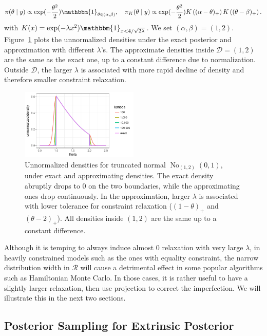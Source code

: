 \documentclass[10pt]{article}
\newcommand{\mc}[1]{\mathcal{#1}}
\DeclareMathOperator{\No}{No}
\DeclareMathOperator{\1}{\mathbbm{1}}
\begin{document}
$$\pi(\theta\mid y)\propto \exp(-\frac{\theta^2}{2}) \mathbbm{1}_{\theta\in(\alpha,\beta)}, \quad \pi_K(\theta\mid y)\propto \exp(-\frac{\theta^2}{2}) K \left ( (\alpha - \theta)_+ \right) K \left ( ( \theta - \beta)_+ \right).$$
with $K(x)= \exp( - \lambda x^2)\mathbbm{1}_{x<4/\sqrt{2\lambda}}$. We set $(\alpha, \beta)=(1,2)$. Figure~\ref{truncated_normal} plots the unnormalized densities under the exact posterior and approximation with different $\lambda$'s. The approximate densities inside $\mc D = (1,2)$ are the same as the exact one, up to a constant difference due to normalization. Outside $\mc D$, the larger $\lambda$ is associated with more rapid decline of density and therefore smaller constraint relaxation.

\begin{figure}[H]
 \centering
 \includegraphics[width=0.5\textwidth]{density_truncated_normal}
\caption{Unnormalized densities for truncated normal $\No_{(1,2)}(0,1)$, under exact and approximating densities. The exact density abruptly drops to $0$ on the two boundaries, while the approximating ones drop continuously. In the approximation, larger $\lambda$ is associated with lower tolerance for constraint relaxation ($( 1-\theta )_+$ and $( \theta - 2)_+$). All densities inside $(1,2)$ are the same up to a constant difference.}
\label{truncated_normal}
\end{figure}

Although it is temping to always induce almost $0$ relaxation with very large $\lambda$, in heavily constrained models such as the ones with equality constraint, the narrow distribution width in $\mc R$ will cause a detrimental effect in some popular algorithms such as Hamiltonian Monte Carlo. In those cases, it is rather useful to have a slightly larger relaxation, then use projection to correct the imperfection. We will illustrate this in the next two sections.

\subsection{Posterior Sampling for Extrinsic Posterior}
\end{document}

